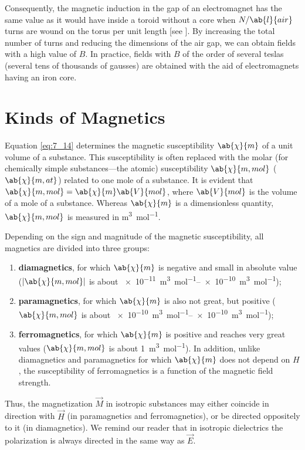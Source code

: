 \noindent
Consequently, the magnetic induction in the gap of an electromagnet has the same value as it would have inside a toroid without a core when $N/\ab{l}{air}$ turns are wound on the torus per unit length [see ].
By increasing the total number of turns and reducing the dimensions of the air gap, we can obtain fields with a high value of $B$.
In practice, fields with $B$ of the order of several teslas (several tens of thousands of gausses) are obtained with the aid of electromagnets having an iron core.

\section{Kinds of Magnetics}\label{sec:7_5}

Equation \eqref{eq:7_14} determines the magnetic susceptibility $\ab{\chi}{m}$ of a unit volume of a substance.
This susceptibility is often replaced with the molar (for chemically simple substances---the atomic) susceptibility $\ab{\chi}{m,mol}$ ($\ab{\chi}{m,at}$) related to one mole of a substance.
It is evident that $\ab{\chi}{m,mol} = \ab{\chi}{m} \ab{V}{mol}$, where $\ab{V}{mol}$ is the volume of
a mole of a substance.
Whereas $\ab{\chi}{m}$ is a dimensionless quantity,
$\ab{\chi}{m,mol}$ is measured in \si{\metre\cubed\per\mole}.

Depending on the sign and magnitude of the magnetic susceptibility, all magnetics are divided into three groups:
\begin{enumerate}[(1)]
    \item \textbf{diamagnetics}, for which $\ab{\chi}{m}$ is negative and small in absolute value ($|\ab{\chi}{m,mol}|$ is about \SIrange{e-11}{e-10}{\metre\cubed\per\mole});
    \item \textbf{paramagnetics}, for which $\ab{\chi}{m}$ is also not great, but positive
    ($\ab{\chi}{m,mol}$ is about \SIrange{e-10}{e-10}{\metre\cubed\per\mole});
    \item \textbf{ferromagnetics}, for which $\ab{\chi}{m}$ is positive and reaches very     great values ($\ab{\chi}{m,mol}$ is about \SI{1}{\metre\cubed\per\mole}). In addition, unlike diamagnetics and paramagnetics for which $\ab{\chi}{m}$ does not depend on $H$, the susceptibility of ferromagnetics is a function of the magnetic field strength.
\end{enumerate}

Thus, the magnetization $\vec{M}$ in isotropic substances may either coincide in direction with $\vec{H}$ (in paramagnetics and ferromagnetics), or be directed oppositely to it (in diamagnetics).
We remind our reader that in isotropic dielectrics the polarization is always directed in the same way as $\vec{E}$.

